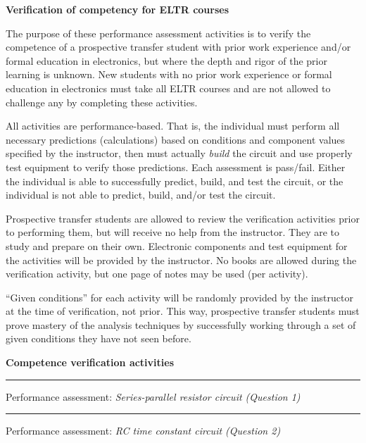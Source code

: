 \centerline{\bf Verification of competency for ELTR courses} \bigskip 
 
The purpose of these performance assessment activities is to verify the competence of a prospective transfer student with prior work experience and/or formal education in electronics, but where the depth and rigor of the prior learning is unknown.  New students with no prior work experience or formal education in electronics must take all ELTR courses and are not allowed to challenge any by completing these activities.

\vskip 10pt

All activities are performance-based.  That is, the individual must perform all necessary predictions (calculations) based on conditions and component values specified by the instructor, then must actually {\it build} the circuit and use properly test equipment to verify those predictions.  Each assessment is pass/fail.  Either the individual is able to successfully predict, build, and test the circuit, or the individual is not able to predict, build, and/or test the circuit.

\vskip 10pt

Prospective transfer students are allowed to review the verification activities prior to performing them, but will receive no help from the instructor.  They are to study and prepare on their own.  Electronic components and test equipment for the activities will be provided by the instructor.  No books are allowed during the verification activity, but one page of notes may be used (per activity).

\vskip 10pt

``Given conditions'' for each activity will be randomly provided by the instructor at the time of verification, not prior.  This way, prospective transfer students must prove mastery of the analysis techniques by successfully working through a set of given conditions they have not seen before.

\vskip 10pt

\noindent
{\bf Competence verification activities}

\vskip 5pt

\hrule \vskip 5pt
\noindent
{}

\hskip 10pt Performance assessment: {\it Series-parallel resistor circuit (Question 1)}
 
\vskip 10pt
\hrule \vskip 5pt
\noindent
{}

\hskip 10pt Performance assessment: {\it RC time constant circuit (Question 2)}
 
